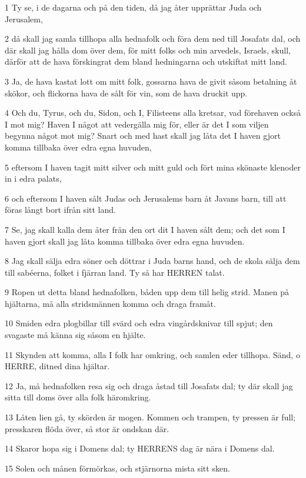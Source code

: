 \par 1 Ty se, i de dagarna och på den tiden, då jag åter upprättar Juda och Jerusalem,
\par 2 då skall jag samla tillhopa alla hednafolk och föra dem ned till Josafats dal, och där skall jag hålla dom över dem, för mitt folks och min arvedels, Israels, skull, därför att de hava förskingrat dem bland hedningarna och utskiftat mitt land.
\par 3 Ja, de hava kastat lott om mitt folk, gossarna hava de givit såsom betalning åt skökor, och flickorna hava de sålt för vin, som de hava druckit upp.
\par 4 Och du, Tyrus, och du, Sidon, och I, Filisteens alla kretsar, vad förehaven också I mot mig? Haven I något att vedergälla mig för, eller är det I som viljen begynna något mot mig? Snart och med hast skall jag låta det I haven gjort komma tillbaka över edra egna huvuden,
\par 5 eftersom I haven tagit mitt silver och mitt guld och fört mina skönaste klenoder in i edra palats,
\par 6 och eftersom I haven sålt Judas och Jerusalems barn åt Javans barn, till att föras långt bort ifrån sitt land.
\par 7 Se, jag skall kalla dem åter från den ort dit I haven sålt dem; och det som I haven gjort skall jag låta komma tillbaka över edra egna huvuden.
\par 8 Jag skall sälja edra söner och döttrar i Juda barns hand, och de skola sälja dem till sabéerna, folket i fjärran land. Ty så har HERREN talat.
\par 9 Ropen ut detta bland hednafolken, båden upp dem till helig strid. Manen på hjältarna, må alla stridsmännen komma och draga framåt.
\par 10 Smiden edra plogbillar till svärd och edra vingårdsknivar till spjut; den svagaste må känna sig såsom en hjälte.
\par 11 Skynden att komma, alla I folk har omkring, och samlen eder tillhopa. Sänd, o HERRE, ditned dina hjältar.
\par 12 Ja, må hednafolken resa sig och draga åstad till Josafats dal; ty där skall jag sitta till doms över alla folk häromkring.
\par 13 Låten lien gå, ty skörden är mogen. Kommen och trampen, ty pressen är full; presskaren flöda över, så stor är ondskan där.
\par 14 Skaror hopa sig i Domens dal; ty HERRENS dag är nära i Domens dal.
\par 15 Solen och månen förmörkas, och stjärnorna mista sitt sken.
